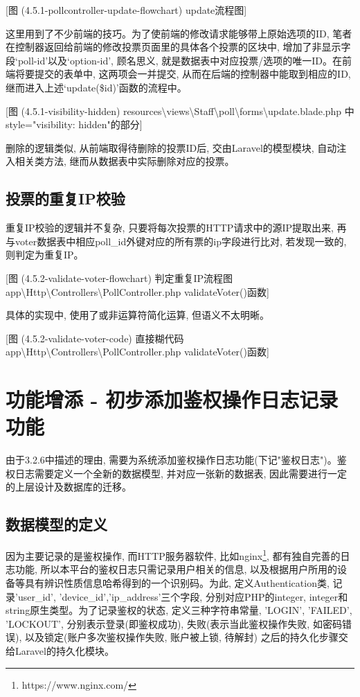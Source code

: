 [图 (4.5.1-pollcontroller-update-flowchart) update流程图]

这里用到了不少前端的技巧。为了使前端的修改请求能够带上原始选项的ID, 笔者在控制器返回给前端的修改投票页面里的具体各个投票的区块中, 增加了非显示字段`poll-id'以及`option-id', 顾名思义, 就是数据表中对应投票/选项的唯一ID。在前端将要提交的表单中, 这两项会一并提交, 从而在后端的控制器中能取到相应的ID, 继而进入上述`update(\$id)'函数的流程中。

 [图 (4.5.1-visibility-hidden) resources\textbackslash views\textbackslash Staff\textbackslash poll\textbackslash forms\textbackslash update.blade.php 中 style="visibility: hidden"的部分]

删除的逻辑类似, 从前端取得待删除的投票ID后, 交由Laravel的模型模块, 自动注入相关类方法, 继而从数据表中实际删除对应的投票。

\subsection{投票的重复IP校验}

重复IP校验的逻辑并不复杂, 只要将每次投票的HTTP请求中的源IP提取出来, 再与voter数据表中相应poll\_id外键对应的所有票的ip字段进行比对, 若发现一致的, 则判定为重复IP。

[图 (4.5.2-validate-voter-flowchart) 判定重复IP流程图 app\textbackslash Http\textbackslash Controllers\textbackslash PollController.php  validateVoter()函数]

具体的实现中, 使用了或非运算符简化运算, 但语义不太明晰。

[图  (4.5.2-validate-voter-code) 直接糊代码 app\textbackslash Http\textbackslash Controllers\textbackslash PollController.php  validateVoter()函数]


\section{功能增添 - 初步添加鉴权操作日志记录功能}

由于3.2.6中描述的理由, 需要为系统添加鉴权操作日志功能(下记"鉴权日志")。鉴权日志需要定义一个全新的数据模型, 并对应一张新的数据表, 因此需要进行一定的上层设计及数据库的迁移。

\subsection{数据模型的定义}

因为主要记录的是鉴权操作, 而HTTP服务器软件, 比如nginx\footnote{https://www.nginx.com/}, 都有独自完善的日志功能, 所以本平台的鉴权日志只需记录用户相关的信息, 以及根据用户所用的设备等具有辨识性质信息哈希得到的一个识别码。为此, 定义Authentication类, 记录'user\_id', 'device\_id','ip\_address'三个字段, 分别对应PHP的integer, integer和string原生类型。为了记录鉴权的状态, 定义三种字符串常量, 'LOGIN', 'FAILED', 'LOCKOUT', 分别表示登录(即鉴权成功), 失败(表示当此鉴权操作失败, 如密码错误), 以及锁定(账户多次鉴权操作失败, 账户被上锁, 待解封) 之后的持久化步骤交给Laravel的持久化模块。


